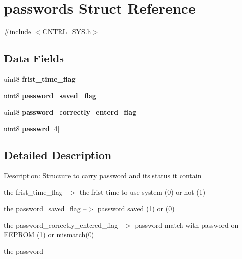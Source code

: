 \hypertarget{structpasswords}{\section{passwords Struct Reference}
\label{structpasswords}
}


{\ttfamily \#include $<$C\+N\+T\+R\+L\+\_\+\+S\+Y\+S.\+h$>$}

\subsection*{Data Fields}
\begin{DoxyCompactItemize}
\item 
\hypertarget{structpasswords_afb981cf38ec9ba03c69be74e333cd0f9}{uint8 {\bfseries frist\+\_\+time\+\_\+flag}}\label{structpasswords_afb981cf38ec9ba03c69be74e333cd0f9}

\item 
\hypertarget{structpasswords_ac94b7e22b8316d61ad86be0380bddd4f}{uint8 {\bfseries password\+\_\+saved\+\_\+flag}}\label{structpasswords_ac94b7e22b8316d61ad86be0380bddd4f}

\item 
\hypertarget{structpasswords_a2c5c58cf431359b72350e6e3873cfd49}{uint8 {\bfseries password\+\_\+correctly\+\_\+enterd\+\_\+flag}}\label{structpasswords_a2c5c58cf431359b72350e6e3873cfd49}

\item 
\hypertarget{structpasswords_ac64c103e42c5f150a2233e0972f55c1d}{uint8 {\bfseries passwrd} \mbox{[}4\mbox{]}}\label{structpasswords_ac64c103e42c5f150a2233e0972f55c1d}

\end{DoxyCompactItemize}


\subsection{Detailed Description}
Description\+: Structure to carry password and its status it contain
\begin{DoxyEnumerate}
\item the frist\+\_\+time\+\_\+flag --$>$ the frist time to use system (0) or not (1)
\item the password\+\_\+saved\+\_\+flag --$>$ password saved (1) or (0)
\item the password\+\_\+correctly\+\_\+entered\+\_\+flag --$>$ password match with password on E\+E\+P\+R\+O\+M (1) or mismatch(0)
\item the password 
\end{DoxyEnumerate}

